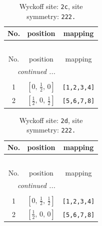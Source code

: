 \documentclass[fleqn,8pt]{jsarticle}
\begin{document}
\renewcommand{\arraystretch}{1.2}
\begin{longtable}{ccc}
\caption{Wyckoff site: {\tt 2c}, site symmetry: {\tt 222.}}
 \\
 \hline \hline
No. & position & mapping \\ \hline \endfirsthead

\multicolumn{2}{l}{\tablename\ \thetable{}} \\
 \hline \hline
No. & position & mapping \\ \hline \endhead

 \hline \hline
\multicolumn{2}{r}{\footnotesize\it continued ...} \\ \endfoot

 \hline \hline
\multicolumn{2}{r}{} \\ \endlastfoot

1 & $\left[ 0,\, \frac{1}{2},\, 0 \right]$ & {\tt [1,2,3,4]} \\ \hline
2 & $\left[ \frac{1}{2},\, 0,\, \frac{1}{2} \right]$ & {\tt [5,6,7,8]} \\
\end{longtable}
\renewcommand{\arraystretch}{1.2}
\begin{longtable}{ccc}
\caption{Wyckoff site: {\tt 2d}, site symmetry: {\tt 222.}}
 \\
 \hline \hline
No. & position & mapping \\ \hline \endfirsthead

\multicolumn{2}{l}{\tablename\ \thetable{}} \\
 \hline \hline
No. & position & mapping \\ \hline \endhead

 \hline \hline
\multicolumn{2}{r}{\footnotesize\it continued ...} \\ \endfoot

 \hline \hline
\multicolumn{2}{r}{} \\ \endlastfoot

1 & $\left[ 0,\, \frac{1}{2},\, \frac{1}{2} \right]$ & {\tt [1,2,3,4]} \\ \hline
2 & $\left[ \frac{1}{2},\, 0,\, 0 \right]$ & {\tt [5,6,7,8]} \\
\end{longtable}
\renewcommand{\arraystretch}{1.2}
\end{document}
